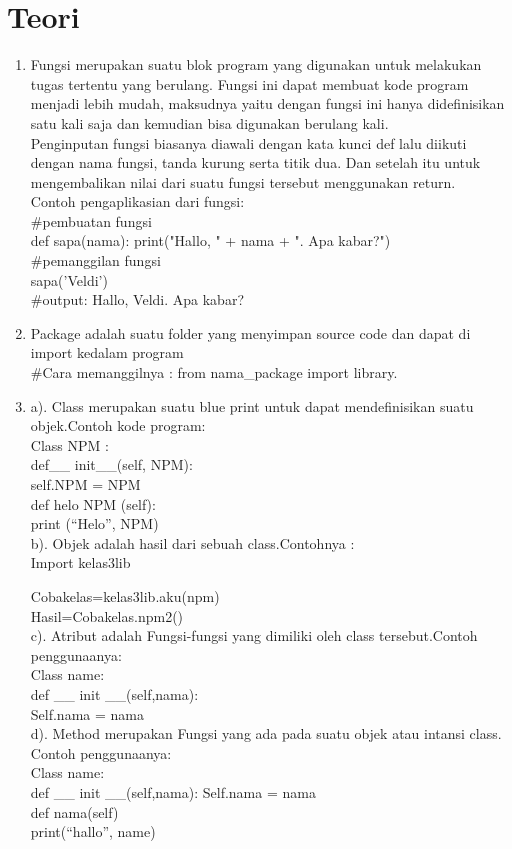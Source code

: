 \chapter*{Teori}

\begin{enumerate}
	\item Fungsi merupakan suatu blok program yang digunakan untuk melakukan tugas tertentu yang berulang. Fungsi ini dapat membuat kode program menjadi lebih mudah, maksudnya yaitu dengan fungsi ini hanya didefinisikan satu kali saja dan kemudian bisa  digunakan berulang kali.\\
    Penginputan fungsi biasanya diawali dengan kata kunci def lalu diikuti dengan nama fungsi, tanda kurung serta titik dua. Dan setelah itu untuk mengembalikan nilai dari suatu fungsi tersebut menggunakan return.\\
	Contoh pengaplikasian dari fungsi:\\
	\#pembuatan fungsi\\
	  def sapa(nama):  
        print("Hallo, " + nama + ". Apa kabar?")\\
	 \#pemanggilan fungsi \\ 
	    sapa('Veldi')\\
	  \#output: Hallo, Veldi. Apa kabar? \\
	
	\item Package adalah suatu folder yang menyimpan source code dan dapat di import kedalam program\\
	\#Cara memanggilnya : from nama\_package import library.
	
	\item a). Class merupakan suatu blue print  untuk  dapat mendefinisikan suatu objek.Contoh kode program: \\
	Class NPM :\\
	def\_\_ init\_\_(self, NPM):\\
		self.NPM = NPM\\
	def  helo NPM (self):\\
		print (“Helo”, NPM)\\
	b). Objek adalah hasil dari sebuah class.Contohnya :\\
	Import kelas3lib
	
	Cobakelas=kelas3lib.aku(npm)\\
 	Hasil=Cobakelas.npm2()\\
	c).	Atribut adalah  Fungsi-fungsi yang dimiliki oleh class tersebut.Contoh penggunaanya:\\
	Class name:\\
	def \_\_ init \_\_(self,nama):\\
	Self.nama = nama\\
	d). Method merupakan Fungsi yang ada pada suatu objek atau intansi class. Contoh penggunaanya:\\
	Class name:\\
	def \_\_ init \_\_(self,nama):
	Self.nama = nama\\
	def nama(self)\\
	print(“hallo”, name)\\
	

\end{enumerate}
